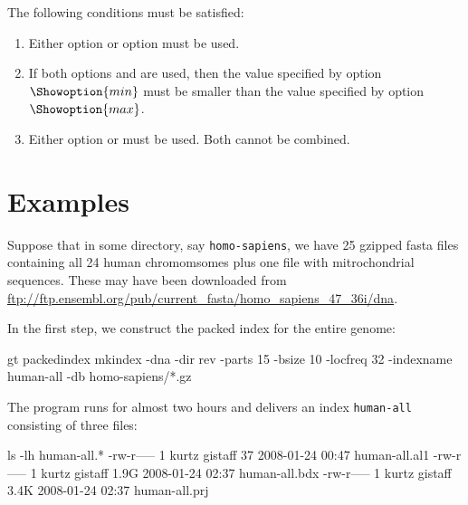 \documentclass[12pt]{article}
\begin{document}
\begin{Justshowoptions}
\begin{AboutMatstat}
\end{AboutMatstat}

\Helpoption

\end{Justshowoptions}
The following conditions must be satisfied:
\begin{enumerate}
\item
Either option   or option  must be used.
\item
If both options  and  are used, then
the value specified by option \(\Showoption{min}\) must be smaller
than the value specified by option \(\Showoption{max}\).
\item
Either option  or  must be used. Both cannot
be combined.
\end{enumerate}

\section{Examples}

Suppose that in some directory, say \texttt{homo-sapiens}, we have 25 gzipped
fasta files containing all 24 human chromomsomes plus one file with 
mitrochondrial sequences. These may have been downloaded from
\url{ftp://ftp.ensembl.org/pub/current_fasta/homo_sapiens_47_36i/dna}.

In the first step, we construct the packed index for the entire genome:

\begin{Output}
gt packedindex mkindex -dna -dir rev -parts 15 -bsize 10 -locfreq 32
                       -indexname human-all -db homo-sapiens/*.gz
\end{Output}

The program runs for almost two hours and delivers 
an index \texttt{human-all} consisting of three files:

\begin{Output}
ls -lh human-all.*
-rw-r----- 1 kurtz gistaff   37 2008-01-24 00:47 human-all.al1
-rw-r----- 1 kurtz gistaff 1.9G 2008-01-24 02:37 human-all.bdx
-rw-r----- 1 kurtz gistaff 3.4K 2008-01-24 02:37 human-all.prj
\end{Output}
\end{document}
